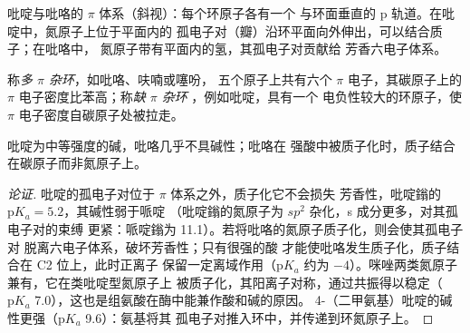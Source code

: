 \begin{omfigure}

{\small 吡啶与吡咯的 $\pi$ 体系（斜视）：每个环原子各有一个
与环面垂直的 p 轨道。在吡啶中，氮原子上位于平面内的
孤电子对（瓣）沿环平面向外伸出，可以结合质子；在吡咯中，
氮原子带有平面内的氢，其孤电子对贡献给
芳香六电子体系。}
\end{omfigure}

\begin{definition}[多 $\pi$ 杂环与缺 $\pi$ 杂环]\label{def:b3:heterocycles:pi-character}
称\emph{多 $\pi$ 杂环}，如吡咯、呋喃或噻吩，
五个原子上共有六个 $\pi$ 电子，其碳原子上的
$\pi$ 电子密度比苯高；称\emph{缺 $\pi$ 杂环}
，例如吡啶，具有一个
电负性较大的环原子，使 $\pi$ 电子密度自碳原子处被拉走。
\end{definition}

\begin{proposition}[碱性]\label{prop:b3:heterocycles:basicity}
吡啶为中等强度的碱，吡咯几乎不具碱性；吡咯在
强酸中被质子化时，质子结合在碳原子而非氮原子上。
\end{proposition}

\begin{proof}[论证]
吡啶的孤电子对位于 $\pi$ 体系之外，质子化它不会损失
芳香性，吡啶鎓的 $\mathrm pK_a = 5.2$，其碱性弱于哌啶
（吡啶鎓的氮原子为 $sp^2$ 杂化，s 成分更多，对其孤电子对的束缚
更紧：哌啶鎓为 11.1）。若将吡咯的氮原子质子化，则会使其孤电子对
脱离六电子体系，破坏芳香性；只有很强的酸
才能使吡咯发生质子化，质子结合在 C2 位上，此时正离子
保留一定离域作用（$\mathrm pK_a$ 约为 $-4$）。咪唑两类氮原子兼有，它在类吡啶型氮原子上
被质子化，其阳离子对称，通过共振得以稳定（$\mathrm pK_a$
7.0），这也是组氨酸在酶中能兼作酸和碱的原因。
4-（二甲氨基）吡啶的碱性更强（$\mathrm pK_a$ 9.6）：氨基将其
孤电子对推入环中，并传递到环氮原子上。
\end{proof}

